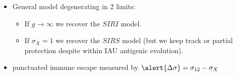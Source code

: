 \documentclass{beamer}
\begin{document}
\begin{frame}
\begin{columns}
\begin{column}{0.7 \linewidth}
  \begin{itemize}
  \item<2-> General model degenerating in 2 limits:
    \begin{itemize}
    \item<2-> If $g \to \infty$ we recover the $SIRI$ model.
    \item<3-> If $\sigma_X=1$ we recover the $SIRS$ model (but we keep
      track or partial protection despite within IAU antigenic
      evolution).
    \end{itemize}
  \item<4-> punctuated immune escape measured by $\alert{\Delta
      \sigma}=\sigma_{12}-\sigma_{X}$
  \end{itemize}
  

  

\end{column}
\end{columns}

\end{frame}
\end{document}
